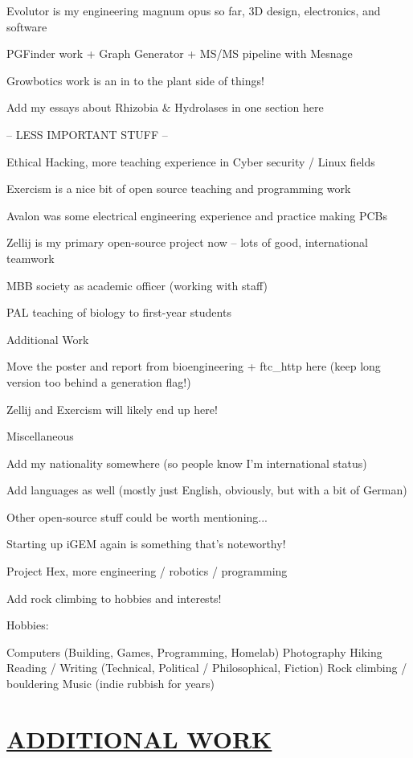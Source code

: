 \documentclass[twocolumn, a4paper, fontsize=9pt, headsepline, footsepline]{scrartcl}
\begin{document}
Evolutor is my engineering magnum opus so far, 3D design, electronics, and software

PGFinder work + Graph Generator + MS/MS pipeline with Mesnage

Growbotics work is an in to the plant side of things!

Add my essays about Rhizobia & Hydrolases in one section here

-- LESS IMPORTANT STUFF --

Ethical Hacking, more teaching experience in Cyber security / Linux fields

Exercism is a nice bit of open source teaching and programming work

Avalon was some electrical engineering experience and practice making PCBs

Zellij is my primary open-source project now – lots of good, international
teamwork

MBB society as academic officer (working with staff)

PAL teaching of biology to first-year students

Additional Work

Move the poster and report from bioengineering + ftc\_http here (keep long
version too behind a generation flag!)

Zellij and Exercism will likely end up here!

Miscellaneous

Add my nationality somewhere (so people know I'm international status)

Add languages as well (mostly just English, obviously, but with a bit of German)

Other open-source stuff could be worth mentioning...

Starting up iGEM again is something that's noteworthy!

Project Hex, more engineering / robotics / programming

Add rock climbing to hobbies and interests!

Hobbies:

Computers (Building, Games, Programming, Homelab)
Photography
Hiking
Reading / Writing (Technical, Political / Philosophical, Fiction)
Rock climbing / bouldering
Music (indie rubbish for years)


\onecolumn
{}
\section*{\ul{ADDITIONAL WORK}}
\end{document}
